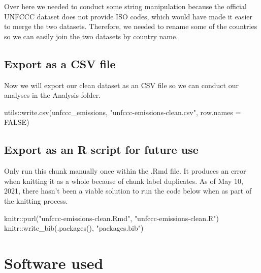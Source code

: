 \documentclass[
  12pt,
]{article}
\newenvironment{Shaded}{}{}
\newcommand{\AttributeTok}[1]{\textcolor[rgb]{0.49,0.56,0.16}{#1}}
\newcommand{\ConstantTok}[1]{\textcolor[rgb]{0.53,0.00,0.00}{#1}}
\newcommand{\FunctionTok}[1]{\textcolor[rgb]{0.02,0.16,0.49}{#1}}
\newcommand{\NormalTok}[1]{#1}
\newcommand{\SpecialCharTok}[1]{\textcolor[rgb]{0.25,0.44,0.63}{#1}}
\newcommand{\StringTok}[1]{\textcolor[rgb]{0.25,0.44,0.63}{#1}}
\begin{document}
Over here we needed to conduct some string manipulation because the
official UNFCCC dataset does not provide ISO codes, which would have
made it easier to merge the two datasets. Therefore, we needed to rename
some of the countries so we can easily join the two datasets by country
name.

\hypertarget{export-as-a-csv-file}{%
\subsection{Export as a CSV file}\label{export-as-a-csv-file}}

Now we will export our clean dataset as an CSV file so we can conduct
our analyses in the Analysis folder.

\begin{Shaded}
\begin{Highlighting}[]
\NormalTok{utils}\SpecialCharTok{::}\FunctionTok{write.csv}\NormalTok{(unfccc\_emissions, }\StringTok{"unfccc{-}emissions{-}clean.csv"}\NormalTok{, }
    \AttributeTok{row.names =} \ConstantTok{FALSE}\NormalTok{)}
\end{Highlighting}
\end{Shaded}

\hypertarget{export-as-an-r-script-for-future-use}{%
\subsection{Export as an R script for future
use}\label{export-as-an-r-script-for-future-use}}

Only run this chunk manually once within the .Rmd file. It produces an
error when knitting it as a whole because of chunk label duplicates. As
of May 10, 2021, there hasn't been a viable solution to run the code
below when as part of the knitting process.

\begin{Shaded}
\begin{Highlighting}[]
\NormalTok{knitr}\SpecialCharTok{::}\FunctionTok{purl}\NormalTok{(}\StringTok{"unfccc{-}emissions{-}clean.Rmd"}\NormalTok{, }
    \StringTok{"unfccc{-}emissions{-}clean.R"}\NormalTok{)}
\NormalTok{knitr}\SpecialCharTok{::}\FunctionTok{write\_bib}\NormalTok{(}\FunctionTok{.packages}\NormalTok{(), }\StringTok{"packages.bib"}\NormalTok{)}
\end{Highlighting}
\end{Shaded}

\hypertarget{software-used}{%
\section*{Software used}\label{software-used}}
\end{document}
